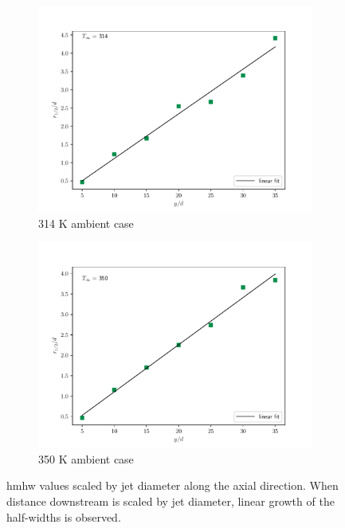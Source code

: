 \begin{figure}[htbp!]
\begin{center}
\begin{subfigure}{0.45\textwidth}
	\includegraphics[scale=.45]{figures/Plots/radial/slices_5/314_ambient/r12_d_vs_x_d.pdf}
	\caption{314 K ambient case} \label{noniso_uin_u0_x_c_1}
\end{subfigure}
\begin{subfigure}{0.45\textwidth}
	\includegraphics[scale=.45]{figures/Plots/radial/slices_5/350_ambient/r12_d_vs_x_d.pdf}
	\caption{350 K ambient case} \label{noniso_uin_u0_x_d_2}
\end{subfigure}
\caption{\gls{hmhw} values scaled by jet diameter along the axial direction. When distance downstream is scaled by jet diameter, linear growth of the half-widths is observed.}
\label{noniso_r12_d_x_d_features}
\end{center}
\end{figure}

